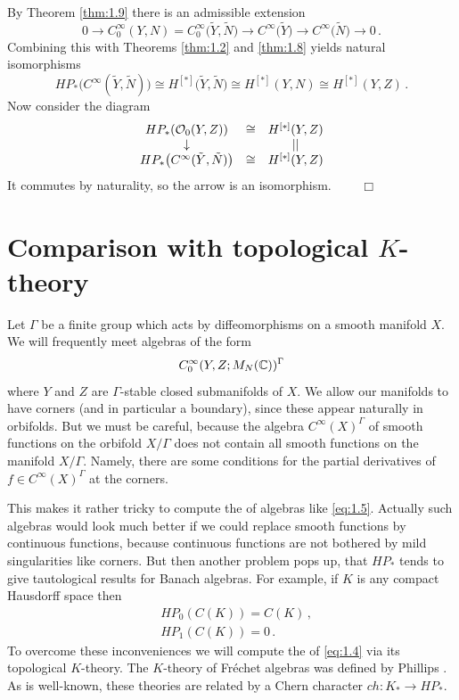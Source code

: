 \noindent By Theorem \ref{thm:1.9} there is an admissible extension
\[
0 \to C_0^\infty (Y,N) = C_0^\infty \big( \tilde Y , \tilde N \big)
\to C^\infty \big( \tilde Y \big) \to C^\infty \big( \tilde N \big)
\to 0 \,.
\]
Combining this with Theorems \ref{thm:1.2} and \ref{thm:1.8} yields natural
isomorphisms
\[
HP_* \big( C^\infty (\tilde Y ,\tilde N) \big) \cong H^{[*]} \big(
\tilde Y ,\tilde N \big) \cong H^{[*]} (Y,N) \cong H^{[*]} (Y,Z) \,.
\]
Now consider the diagram
\[
\begin{array}{ccc}
HP_* (\mathcal O_0 (Y,Z)) & \cong & H^{[*]} (Y,Z) \\
\downarrow & & || \\
HP_* \big( C^\infty (\tilde Y ,\tilde N) \big) & \cong &
H^{[*]} (Y,Z)
\end{array}
\]
It commutes by naturality, so the arrow is an isomorphism.
$\qquad \Box$
\vspace{4mm}




\section{Comparison with topological $K$-theory}
\label{sec:1.3}

Let $\Gamma$ be a finite group which acts by diffeomorphisms on a 
smooth manifold $X$. We will frequently meet algebras of the form
\begin{equation}\label{eq:1.5}
C_0^\infty (Y,Z;M_N (\mathbb C) )^\Gamma
\end{equation}
where $Y$ and $Z$ are $\Gamma$-stable closed submanifolds of $X$.
We allow our manifolds to have corners (and in particular a
boundary), since these appear naturally in orbifolds. But we must
be careful, because the algebra $C^\infty (X)^\Gamma$ of smooth
functions on the orbifold $X/ \Gamma$ does not contain all smooth
functions on the manifold $X / \Gamma$. Namely, there are some
conditions for the partial derivatives of $f \in C^\infty
(X)^\Gamma$ at the corners.

This makes it rather tricky to compute the \pch of algebras
like \eqref{eq:1.5}. Actually such algebras would look much
better if we could replace smooth functions by continuous
functions, because continuous functions are not bothered by
mild singularities like corners. But then another problem
pops up, that $HP_*$ tends to give tautological results
for Banach algebras. For example, if $K$ is any compact
Hausdorff space then
\begin{align*}
& HP_0 (C(K)) = C(K)\,, \\
& HP_1 (C(K)) = 0 \,.
\end{align*}
To overcome these inconveniences we will compute the \pch of \eqref{eq:1.4} via 
its topological $K$-theory. The $K$-theory of Fr\'echet algebras was
defined by Phillips \cite{Phi}. As is well-known, these theories are related 
by a Chern character $ch : K_* \to HP_*$.

